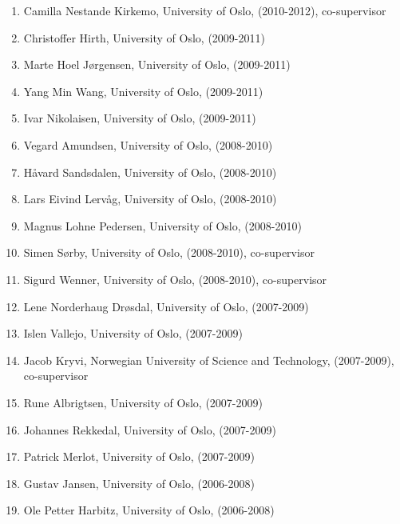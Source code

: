 \documentclass[%
oneside,                 %
final,                   %
10pt]{article}
\begin{document}
\begin{enumerate}
\item Camilla Nestande Kirkemo, University of Oslo, (2010-2012), co-supervisor

\item Christoffer Hirth, University of Oslo, (2009-2011)

\item Marte Hoel Jørgensen, University of Oslo, (2009-2011)

\item Yang Min Wang, University of Oslo, (2009-2011)

\item Ivar Nikolaisen, University of Oslo, (2009-2011)

\item Vegard Amundsen, University of Oslo, (2008-2010)

\item Håvard Sandsdalen, University of Oslo, (2008-2010)

\item Lars Eivind Lervåg, University of Oslo, (2008-2010)

\item Magnus Lohne Pedersen, University of Oslo, (2008-2010)

\item Simen Sørby, University of Oslo, (2008-2010), co-supervisor

\item Sigurd Wenner, University of Oslo, (2008-2010), co-supervisor

\item Lene Norderhaug Drøsdal, University of Oslo, (2007-2009)

\item Islen Vallejo, University of Oslo, (2007-2009)

\item Jacob Kryvi, Norwegian University of Science and Technology, (2007-2009), co-supervisor

\item Rune Albrigtsen, University of Oslo, (2007-2009)

\item Johannes Rekkedal, University of Oslo, (2007-2009)

\item Patrick Merlot, University of Oslo, (2007-2009)

\item Gustav Jansen, University of Oslo, (2006-2008)

\item Ole Petter Harbitz, University of Oslo, (2006-2008)


\end{enumerate}
\end{document}
